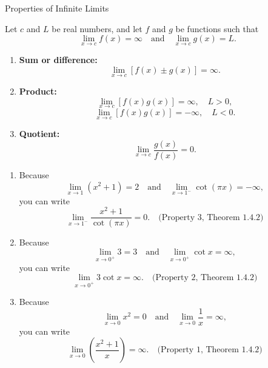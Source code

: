 \documentclass[12pt]{article}
\theoremstyle{beautifulthm}
\begin{document}
\begin{mytheorem}{Properties of Infinite Limits}{}

Let $c$ and $L$ be real numbers, and let $f$ and $g$ be functions such that
\[
\lim_{x \to c} f(x) = \infty \quad \text{and} \quad \lim_{x \to c} g(x) = L.
\]

\begin{enumerate}
    \item \textbf{Sum or difference:} 
    \[
    \lim_{x \to c} [f(x) \pm g(x)] = \infty.
    \]

    \item \textbf{Product:} 
    \[
    \lim_{x \to c} [f(x)g(x)] = \infty, \quad L > 0,
    \]
    \[
    \lim_{x \to c} [f(x)g(x)] = -\infty, \quad L < 0.
    \]

    \item \textbf{Quotient:} 
    \[
    \lim_{x \to c} \frac{g(x)}{f(x)} = 0.
    \]
\end{enumerate}


\end{mytheorem}
\begin{tcolorbox}[colback=examplebg, colframe=red!75!black, title=\textbf{EXAMPLE 3: Determining Limits}, fonttitle=\bfseries, sharp corners]

\begin{enumerate}

    \item[\textbf{a.}] Because 
    \[
    \lim_{x \to 1} \left( x^2 + 1 \right) = 2 \quad \text{and} \quad \lim_{x \to 1^-} \cot (\pi x) = -\infty,
    \]
    you can write
    \[
    \lim_{x \to 1^-} \frac{x^2 + 1}{\cot (\pi x)} = 0. \quad \text{(Property 3, Theorem 1.4.2)}
    \]

    \item[\textbf{b.}] Because 
    \[
    \lim_{x \to 0^+} 3 = 3 \quad \text{and} \quad \lim_{x \to 0^+} \cot x = \infty,
    \]
    you can write
    \[
    \lim_{x \to 0^+} 3 \cot x = \infty. \quad \text{(Property 2, Theorem 1.4.2)}
    \]

    \item[\textbf{c.}] Because 
    \[
    \lim_{x \to 0} x^2 = 0 \quad \text{and} \quad \lim_{x \to 0} \frac{1}{x} = \infty,
    \]
    you can write
    \[
    \lim_{x \to 0} \left( \frac{x^2 + 1}{x} \right) = \infty. \quad \text{(Property 1, Theorem 1.4.2)}
    \]
\end{enumerate}
\end{tcolorbox}
\end{document}

